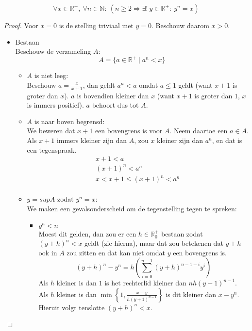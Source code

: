 \documentclass[main.tex]{subfiles}
\begin{document}
\begin{st}
  \[ \forall x\in \mathbb{R}^{+},\ \forall n\in \mathbb{N}:\ (n\ge 2 \Rightarrow \exists!\ y\in \mathbb{R}^{+}:\ y^{n}=x) \]
  
  \begin{proof}
    Voor $x=0$ is de stelling triviaal met $y=0$.
    Beschouw daarom $x>0$.
    \begin{itemize}
    \item Bestaan\\
      Beschouw de verzameling $A$:
      \[ A = \{ a\in \mathbb{R}^{+}\mid a^{n}<x \} \]
      \begin{itemize}
      \item $A$ is niet leeg:\\
        Beschouw $a=\frac{x}{x+1}$, dan geldt $a^{n} < a$ omdat $a \le 1$ geldt (want $x+1$ is groter dan $x$).
        $a$ is bovendien kleiner dan $x$ (want $x+1$ is groter dan $1$, $x$ is immers positief).
        $a$ behoort dus tot $A$.
      \item $A$ is naar boven begrensd:\\
        We beweren dat $x+1$ een bovengrens is voor $A$.
        Neem daartoe een $a\in A$.
        Als $x+1$ immers kleiner zijn dan $A$, zou $x$ kleiner zijn dan $a^{n}$, en dat is een tegenspraak.
        \[ 
        \begin{array}{c}
          x+1 < a\\
          (x+1)^{n} < a^{n}\\
          x < x+1 \le (x+1)^{n} < a^{n}\\
        \end{array}
        \]
      \item $y = sup A$ zodat $y^{n}=x$:\\
        We maken een gevalsonderscheid om de tegenstelling tegen te spreken:
        \begin{itemize}
        \item $y^{n}<n$\\
          Moest dit gelden, dan zou er een $h\in \mathbb{R}_{0}^{+}$ bestaan zodat $(y+h)^{n}<x$ geldt (zie hierna), maar dat zou betekenen dat $y+h$ ook in $A$ zou zitten en dat kan niet omdat $y$ een bovengrens is.
          \[ (y+h)^{n}-y^{n} = h\left( \sum^{n-1}_{i=0}(y+h)^{n-1-i}y^{i}\right) \]
          Als $h$ kleiner is dan $1$ is het rechterlid kleiner dan $nh(y+1)^{n-1}$.\waarom
          Als $h$ kleiner is dan $\min\left\{ 1,\frac{x-y}{h(y+1)^{n-1}}\right\}$ is dit kleiner dan $x-y^{n}$\waarom.
          Hieruit volgt tenslotte $(y+h)^{n}<x$.

\end{itemize}
\end{itemize}
\end{itemize}
\end{proof}
\end{st}
\end{document}
